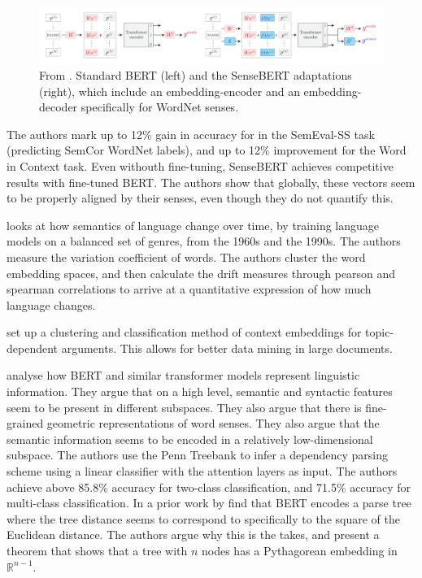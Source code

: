 \documentclass[a4paper,12pt,twoside,openright]{report}
\begin{document}
\begin{figure}[H]
	\center
  \includegraphics[width=\linewidth]{./assets/relatedwork/sensebert.png}
  \caption{From \cite{levine19}. Standard BERT (left) and the SenseBERT adaptations (right), which include an embedding-encoder and an embedding-decoder specifically for WordNet senses.}
  \label{fig:embeddings_by_language}
\end{figure}

The authors mark up to 12\% gain in accuracy for in the SemEval-SS task (predicting SemCor WordNet labels), and up to 12\% improvement for the Word in Context task.
Even withouth fine-tuning, SenseBERT achieves competitive results with fine-tuned BERT.
The authors show that globally, these vectors seem to be properly aligned by their senses, even though they do not quantify this.

\cite{martinc20} looks at how semantics of language change over time, by training language models on a balanced set of genres, from the 1960s and the 1990s.
The authors measure the variation coefficient of words.
The authors cluster the word embedding spaces, and then calculate the drift measures through pearson and spearman correlations to arrive at a quantitative expression of how much language changes.

\cite{reimers19} set up a clustering and classification method of context embeddings for topic-dependent arguments.
This allows for better data mining in large documents.

\cite{coenen19} analyse how BERT and similar transformer models represent linguistic information.
They argue that on a high level, semantic and syntactic features seem to be present in different subspaces.
They also argue that there is fine-grained geometric representations of word senses.
They also argue that the semantic information seems to be encoded in a relatively low-dimensional subspace.
The authors use the Penn Treebank 
to infer a dependency parsing scheme using a linear classifier with the attention layers as input.
The authors achieve above 85.8\% accuracy for two-class classification, and 71.5\% accuracy for multi-class classification.
In a prior work by \cite{hewitt19} find that BERT encodes a parse tree where the tree distance seems to correspond to specifically to the square of the Euclidean distance.
The authors argue why this is the takes, and present a theorem that shows that a tree with $n$ nodes has a Pythagorean embedding in $\mathbb{R}^{n-1}$.
\end{document}
